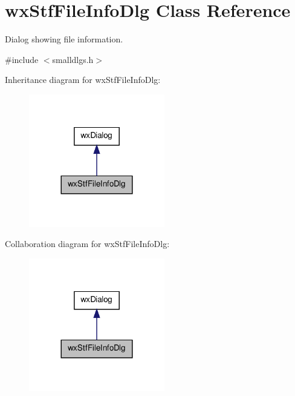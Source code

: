 \hypertarget{classwxStfFileInfoDlg}{
\section{wxStfFileInfoDlg Class Reference}
\label{classwxStfFileInfoDlg}
}


Dialog showing file information.  




{\ttfamily \#include $<$smalldlgs.h$>$}



Inheritance diagram for wxStfFileInfoDlg:
\nopagebreak
\begin{figure}[H]
\begin{center}
\leavevmode
\includegraphics[width=168pt]{classwxStfFileInfoDlg__inherit__graph}
\end{center}
\end{figure}


Collaboration diagram for wxStfFileInfoDlg:
\nopagebreak
\begin{figure}[H]
\begin{center}
\leavevmode
\includegraphics[width=168pt]{classwxStfFileInfoDlg__coll__graph}
\end{center}
\end{figure}
